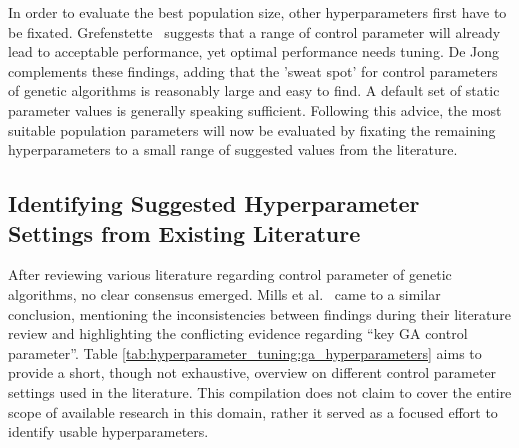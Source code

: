 In order to evaluate the best population size, other hyperparameters first have to be fixated. Grefenstette~\cite{grefenstette_optimization_1986} suggests that a range of control parameter will already lead to acceptable performance, yet optimal performance needs tuning. De Jong~\cite{kacprzyk_parameter_2007} complements these findings, adding that the 'sweat spot' for control parameters of genetic algorithms is reasonably large and easy to find. A default set of static parameter values is generally speaking sufficient. Following this advice, the most suitable population parameters will now be evaluated by fixating the remaining hyperparameters to a small range of suggested values from the literature.

\subsection{Identifying Suggested Hyperparameter Settings from Existing Literature}
After reviewing various literature regarding control parameter of genetic algorithms, no clear consensus emerged. Mills et al.~\cite{mills_determining_2015} came to a similar conclusion, mentioning the inconsistencies between findings during their literature review and highlighting the conflicting evidence regarding \enquote{key GA control parameter}. Table \ref{tab:hyperparameter_tuning:ga_hyperparameters} aims to provide a short, though not exhaustive, overview on different control parameter settings used in the literature. This compilation does not claim to cover the entire scope of available research in this domain, rather it served as a focused effort to identify usable hyperparameters.

